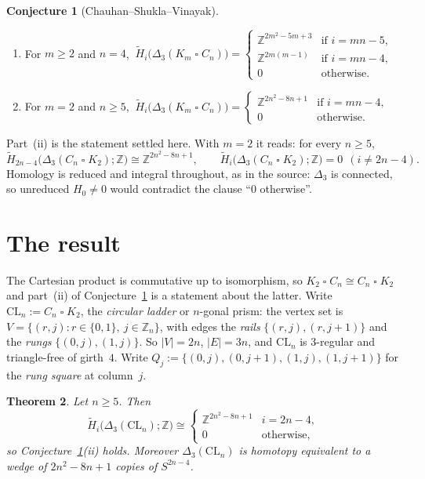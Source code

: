 \documentclass[11pt]{amsart}
\newtheorem{theorem}{Theorem}
\theoremstyle{definition}
\newtheorem{conjecture}[theorem]{Conjecture}
\newcommand{\CL}{\mathrm{CL}}
\newcommand{\bx}{\mathbin{\square}}
\newcommand{\Dl}{\Delta}
\newcommand{\Zm}{\mathbb{Z}}
\begin{document}
\begin{conjecture}[Chauhan--Shukla--Vinayak]\label{conj:csv}
\begin{enumerate}
\item[(i)] For $m\ge2$ and $n=4$,
 $\ \widetilde H_i\bigl(\Dl_3(K_m\bx C_n)\bigr)=
   \begin{cases}
    \Zm^{2m^2-5m+3} & \text{if } i=mn-5,\\
    \Zm^{2m(m-1)} & \text{if } i=mn-4,\\
    0 & \text{otherwise.}
   \end{cases}$
\item[(ii)] For $m=2$ and $n\ge5$,
 $\ \widetilde H_i\bigl(\Dl_3(K_m\bx C_n)\bigr)=
   \begin{cases}
    \Zm^{2n^2-8n+1} & \text{if } i=mn-4,\\
    0 & \text{otherwise.}
   \end{cases}$
\end{enumerate}
\end{conjecture}

Part~(ii) is the statement settled here. With $m=2$ it reads: for every $n\ge5$,
\begin{equation}\label{eq:target}
 \widetilde H_{2n-4}\bigl(\Dl_3(C_n\bx K_2);\Zm\bigr)\cong\Zm^{2n^2-8n+1},
 \qquad
 \widetilde H_i\bigl(\Dl_3(C_n\bx K_2);\Zm\bigr)=0\ \ (i\ne 2n-4).
\end{equation}
Homology is reduced and integral throughout, as in the source: $\Dl_3$ is connected, so unreduced
$H_0\ne0$ would contradict the clause ``$0$ otherwise''.

\section{The result}\label{sec:result}

The Cartesian product is commutative up to isomorphism, so $K_2\bx C_n\cong C_n\bx K_2$ and
part~(ii) of Conjecture~\ref{conj:csv} is a statement about the latter.
Write $\CL_n:=C_n\bx K_2$, the \emph{circular ladder} or $n$-gonal prism: the vertex set is
$V=\{(r,j): r\in\{0,1\},\ j\in\Zm_n\}$, with edges the \emph{rails} $\{(r,j),(r,j+1)\}$ and the
\emph{rungs} $\{(0,j),(1,j)\}$. So $|V|=2n$, $|E|=3n$, and $\CL_n$ is $3$-regular and triangle-free
of girth~$4$. Write $Q_j:=\{(0,j),(0,j{+}1),(1,j),(1,j{+}1)\}$ for the \emph{rung square} at
column~$j$.

\begin{theorem}\label{thm:main}
Let $n\ge5$. Then
\[
 \widetilde H_i\bigl(\Dl_3(\CL_n);\Zm\bigr)\cong
 \begin{cases}
  \Zm^{2n^2-8n+1} & i=2n-4,\\
  0 & \text{otherwise,}
 \end{cases}
\]
so Conjecture~\ref{conj:csv}(ii) holds. Moreover $\Dl_3(\CL_n)$ is homotopy equivalent to a wedge of
$2n^2-8n+1$ copies of $S^{2n-4}$.
\end{theorem}
\end{document}
